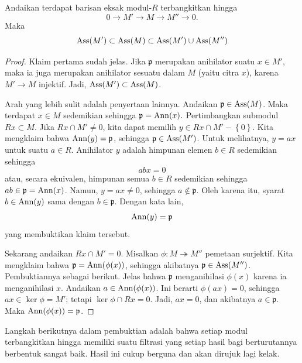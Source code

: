 \begin{lemma} \label{assexact} 
Andaikan terdapat barisan eksak modul-$R$ terbangkitkan hingga
\[ 0 \to M' \to M \to M'' \to 0.  \]
Maka 
\[\operatorname{Ass}(M') \subset \operatorname{Ass}(M) \subset \operatorname{Ass}(M') \cup \operatorname{Ass}(M'')  \]
\end{lemma} 
\begin{proof} 
Klaim pertama sudah jelas. Jika $\mathfrak{p}$ merupakan anihilator
suatu $x \in M'$, maka ia juga merupakan anihilator sesuatu dalam $M$ (yaitu citra
$x$), karena
$M' \to M$ injektif. Jadi, $\operatorname{Ass}(M') \subset \operatorname{Ass}(M)$. 

Arah yang lebih sulit adalah penyertaan lainnya. Andaikan $\mathfrak{p} \in \operatorname{Ass}(M)$.
Maka terdapat $x \in M$ sedemikian sehingga
$\mathfrak{p} = \operatorname{Ann}(x).$
Pertimbangkan submodul $Rx \subset M$. Jika $Rx \cap M' \neq 0$, kita dapat
memilih $y \in Rx \cap M' - \left\{0\right\}$. Kita mengklaim bahwa $\operatorname{Ann}(y) =
\mathfrak{p}$, sehingga $\mathfrak{p} \in \operatorname{Ass}(M')$.
Untuk melihatnya, $ y = ax$ untuk suatu $a \in R$. Anihilator $y$ adalah himpunan elemen
$b \in R$ sedemikian sehingga
\[ abx = 0  \]
atau, secara ekuivalen, himpunan semua $b \in R$ sedemikian sehingga $ab \in \mathfrak{p} =
\operatorname{Ann}(x)$. Namun, $y = ax \neq 0$, sehingga $a \notin \mathfrak{p}$. Oleh
karena itu, syarat $b \in \operatorname{Ann}(y)$ sama dengan $b \in \mathfrak{p}$. Dengan
kata lain, 
\[ \operatorname{Ann}(y) = \mathfrak{p}  \]
yang membuktikan klaim tersebut.

Sekarang andaikan $Rx \cap M' = 0$. Misalkan $\phi: M \twoheadrightarrow M''$
pemetaan surjektif. Kita mengklaim bahwa $\mathfrak{p} = \operatorname{Ann}(\phi(x))$, sehingga
akibatnya
$\mathfrak{p} \in \operatorname{Ass}(M'')$. Pembuktiannya sebagai berikut. Jelas bahwa $\mathfrak{p}$
menganihilasi $\phi(x)$ karena ia menganihilasi $x$. Andaikan $a \in \operatorname{Ann}(\phi(x))$.
Ini berarti $\phi(ax) = 0$, sehingga $ax \in \ker \phi=M'$; tetapi $\ker \phi \cap Rx =
0$. Jadi, $ax = 0$, dan akibatnya $a \in \mathfrak{p}$. Maka $\operatorname{Ann}(\phi(x)) = \mathfrak{p}$. 
\end{proof} 

Langkah berikutnya dalam pembuktian  adalah bahwa setiap
modul terbangkitkan hingga
memiliki suatu filtrasi yang setiap hasil bagi berturutannya berbentuk sangat baik.
Hasil ini cukup berguna dan akan dirujuk lagi kelak.

